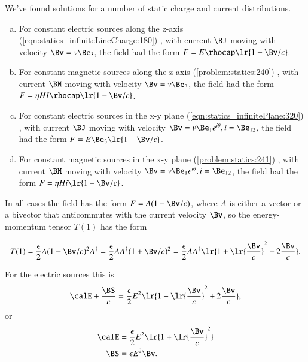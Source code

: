 %
%

We've found solutions for a number of static charge and current distributions.

\begin{enumerate}[(a)]
\item For constant electric sources along the z-axis
(\cref{eqn:statics_infiniteLineCharge:180})
, with current \( \BJ \) moving with velocity \( \Bv = v \Be_3 \), the field had the form \( F = E \rhocap \lr{ 1 - \Bv/c } \).
\item For constant magnetic sources along the z-axis
(\cref{problem:statics:240})
, with current \( \BM \) moving with velocity \( \Bv = v \Be_3 \), the field had the form \( F = \eta H I \rhocap \lr{ 1 - \Bv/c } \).
\item For constant electric sources in the x-y plane
(\cref{eqn:statics_infinitePlane:320})
, with current \( \BJ \) moving with velocity \( \Bv = v \Be_1 e^{i\theta}, i = \Be_{12} \), the field had the form \( F = E \Be_3 \lr{ 1 - \Bv/c } \).
\item For constant magnetic sources in the x-y plane
(\cref{problem:statics:241})
, with current \( \BM \) moving with velocity \( \Bv = v \Be_1 e^{i\theta}, i = \Be_{12} \), the field had the form \( F = \eta H i \lr{ 1 - \Bv/c } \).
\end{enumerate}

In all cases the field has the form \( F = A ( 1 - \Bv/c ) \), where \( A \) is either a vector or a bivector that anticommutes with the current velocity \( \Bv \), so the energy-momentum tensor \( T(1) \) has the form

\begin{dmath}\label{eqn:poyntingStaticExamples:860}
T(1)
= \frac{\epsilon}{2} A ( 1 - \Bv/c )^2 A^\dagger
= \frac{\epsilon}{2} A A^\dagger ( 1 + \Bv/c )^2
= \frac{\epsilon}{2} A A^\dagger \lr{ 1 + \lr{ \frac{\Bv}{c} }^2 + 2 \frac{\Bv}{c} }.
\end{dmath}

For the electric sources this is
\begin{dmath}\label{eqn:poyntingStaticExamples:880}
\calE + \frac{\BS}{c} = \frac{\epsilon}{2} E^2 \lr{ 1 + \lr{ \frac{\Bv}{c} }^2 + 2 \frac{\Bv}{c} },
\end{dmath}
or
\begin{dmath}\label{eqn:poyntingStaticExamples:900}
\begin{aligned}
\calE &= \frac{\epsilon}{2} E^2 \lr{ 1 + \lr{ \frac{\Bv}{c} }^2 } \\
\BS &= \epsilon E^2 \Bv.
\end{aligned}
\end{dmath}

